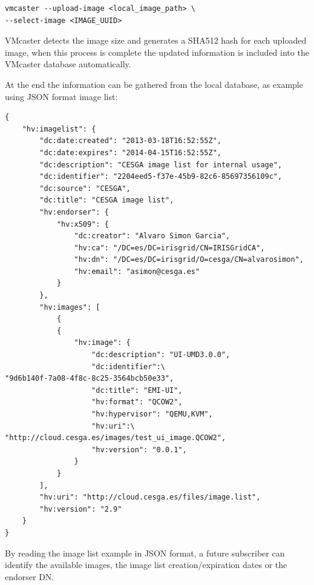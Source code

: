 \documentclass{cai}
\begin{document}
\begin{verbatim}
vmcaster --upload-image <local_image_path> \
--select-image <IMAGE_UUID>
\end{verbatim}

VMcaster detects the image size and generates a SHA512 hash for each uploaded image, when this process is complete the updated information is included into the VMcaster database automatically.

At the end the information can be gathered from the local database, as example using JSON format image list:
\begin{verbatim}
{
    "hv:imagelist": {
        "dc:date:created": "2013-03-18T16:52:55Z", 
        "dc:date:expires": "2014-04-15T16:52:55Z", 
        "dc:description": "CESGA image list for internal usage", 
        "dc:identifier": "2204eed5-f37e-45b9-82c6-85697356109c", 
        "dc:source": "CESGA", 
        "dc:title": "CESGA image list", 
        "hv:endorser": {
            "hv:x509": {
                "dc:creator": "Alvaro Simon Garcia", 
                "hv:ca": "/DC=es/DC=irisgrid/CN=IRISGridCA", 
                "hv:dn": "/DC=es/DC=irisgrid/O=cesga/CN=alvarosimon", 
                "hv:email": "asimon@cesga.es"
            }
        }, 
        "hv:images": [
            {
            {
                "hv:image": {
                    "dc:description": "UI-UMD3.0.0", 
                    "dc:identifier":\ 
"9d6b140f-7a08-4f8c-8c25-3564bcb50e33", 
                    "dc:title": "EMI-UI", 
                    "hv:format": "QCOW2", 
                    "hv:hypervisor": "QEMU,KVM",  
                    "hv:uri":\ 
"http://cloud.cesga.es/images/test_ui_image.QCOW2", 
                    "hv:version": "0.0.1", 
                }
            }
        ], 
        "hv:uri": "http://cloud.cesga.es/files/image.list", 
        "hv:version": "2.9"
    }
}
\end{verbatim}
By reading the image list example in JSON format, a future subscriber can identify the available images, the image list creation/expiration dates or the endorser DN.
\end{document}
